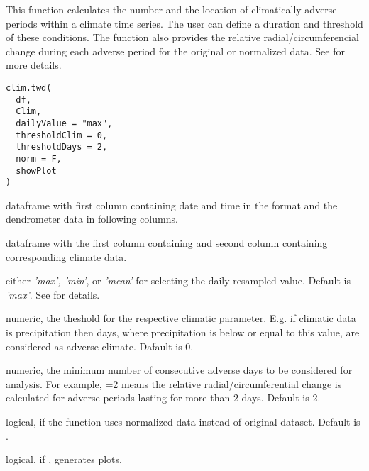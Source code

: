 \documentclass[a4paper]{book}
\begin{document}
%
\begin{Description}\relax
This function calculates the number and the location of climatically adverse periods within a climate time series. The user can define a duration and threshold of these conditions. The function also provides the relative radial/circumferencial change during each adverse period for the original or normalized data. See  for more details.
\end{Description}
%
\begin{Usage}
\begin{verbatim}
clim.twd(
  df,
  Clim,
  dailyValue = "max",
  thresholdClim = 0,
  thresholdDays = 2,
  norm = F,
  showPlot
)
\end{verbatim}
\end{Usage}
%
\begin{Arguments}
\begin{ldescription}
\item[\code{df}] dataframe with first column containing date and time in the format  and the dendrometer data in following columns.

\item[\code{Clim}] dataframe with the first column containing  and second column containing corresponding climate data.

\item[\code{dailyValue}] either \emph{'max', 'min'}, or \emph{'mean'} for selecting the daily resampled value. Default is \emph{'max'}. See  for details.

\item[\code{thresholdClim}] numeric, the theshold for the respective climatic parameter. E.g. if climatic data is precipitation then days, where precipitation is below or equal to this value, are considered as adverse climate. Dafault is 0.

\item[\code{thresholdDays}] numeric, the minimum number of consecutive adverse days to be considered for analysis. For example, =2 means the relative radial/circumferential change is calculated for adverse periods lasting for more than 2 days. Default is 2.

\item[\code{norm}] logical, if  the function uses normalized data instead of original dataset. Default is .

\item[\code{showPlot}] logical, if , generates plots.
\end{ldescription}
\end{Arguments}
\end{document}

